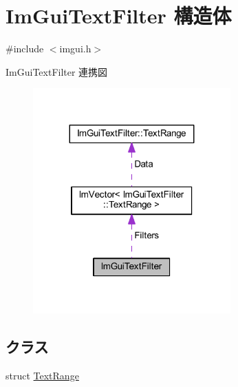 \hypertarget{struct_im_gui_text_filter}{}\section{Im\+Gui\+Text\+Filter 構造体}
\label{struct_im_gui_text_filter}


{\ttfamily \#include $<$imgui.\+h$>$}



Im\+Gui\+Text\+Filter 連携図\nopagebreak
\begin{figure}[H]
\begin{center}
\leavevmode
\includegraphics[width=215pt]{struct_im_gui_text_filter__coll__graph}
\end{center}
\end{figure}
\subsection*{クラス}
\begin{DoxyCompactItemize}
\item 
struct \mbox{\hyperlink{struct_im_gui_text_filter_1_1_text_range}{Text\+Range}}
\end{DoxyCompactItemize}
